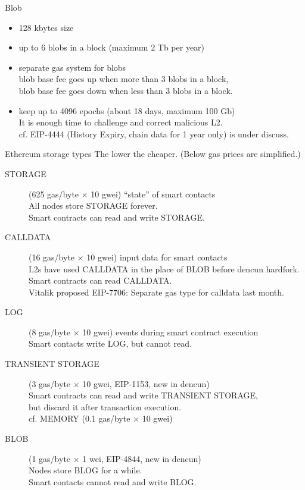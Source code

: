 \documentclass[10pt]{beamer}
\begin{document}
\begin{frame}[fragile]{Blob}
\begin{itemize}
  \item 128 kbytes size
  \item up to 6 blobs in a block (maximum 2 Tb per year)
  \item separate gas system for blobs \\
    blob base fee goes up when more than 3 blobs in a block, \\
    blob base fee goes down when less than 3 blobs in a block.
  \item keep up to 4096 epochs (about 18 days, maximum 100 Gb) \\
    It is enough time to challenge and correct malicious L2. \\
    cf. EIP-4444 (History Expiry, chain data for 1 year only) is under discuss.
\end{itemize}
\end{frame}

\begin{frame}[fragile]{Ethereum storage types}
The lower the cheaper. (Below gas prices are simplified.)
\begin{footnotesize}
\begin{description}
  \item[STORAGE] (625 gas/byte $\times$ 10 gwei) ``state'' of smart contacts \\
    All nodes store STORAGE forever. \\
    Smart contracts can read and write STORAGE.
  \item[CALLDATA] (16 gas/byte $\times$ 10 gwei) input data for smart contacts \\
    L2s have used CALLDATA in the place of BLOB before dencun hardfork. \\
    Smart contracts can read CALLDATA. \\
    Vitalik proposed EIP-7706: Separate gas type for calldata last month.
  \item[LOG] (8 gas/byte $\times$ 10 gwei) events during smart contract execution \\
    Smart contacts write LOG, but cannot read.
  \item[TRANSIENT STORAGE] (3 gas/byte $\times$ 10 gwei, EIP-1153, new in dencun) \\
    Smart contracts can read and write TRANSIENT STORAGE, \\
    but discard it after transaction execution. \\
    cf. MEMORY (0.1 gas/byte $\times$ 10 gwei)
  \item[\colorbox{orange!20}{BLOB}] (1 gas/byte $\times$ 1 wei, EIP-4844, new in dencun) \\
    Nodes store BLOG for a while. \\
    Smart contacts cannot read and write BLOG.
\end{description}
\end{footnotesize}
\end{frame}
\end{document}
